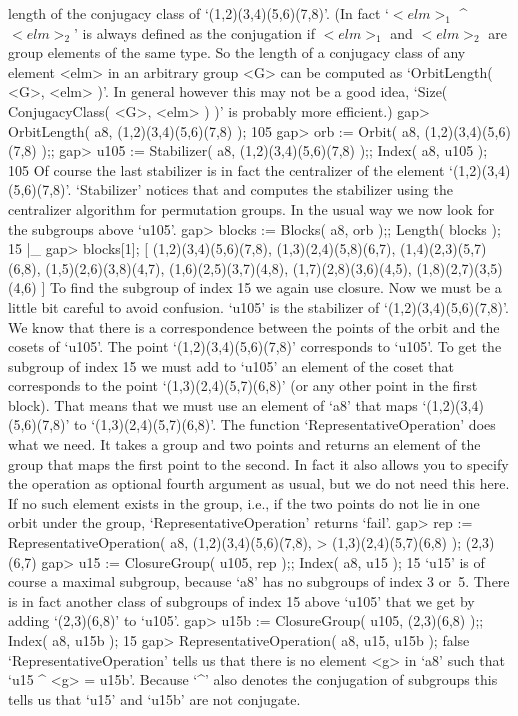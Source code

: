 length of  the  conjugacy   class of  `(1,2)(3,4)(5,6)(7,8)'.   (In  fact
`$<elm>_1$ ^ $<elm>_2$' is always defined as the conjugation if $<elm>_1$
and $<elm>_2$ are group elements  of the same  type. So  the length of  a
conjugacy  class of any  element <elm> in an   arbitrary group <G> can be
computed as `OrbitLength( <G>, <elm> )'.  In general however this may not
be a good  idea, `Size( ConjugacyClass( <G>,  <elm> ) )' is probably more
efficient.)
\beginexample
    gap> OrbitLength( a8, (1,2)(3,4)(5,6)(7,8) );
    105
    gap> orb := Orbit( a8, (1,2)(3,4)(5,6)(7,8) );;
    gap> u105 := Stabilizer( a8, (1,2)(3,4)(5,6)(7,8) );; Index( a8, u105 );
    105 
\endexample
Of course the  last stabilizer is in  fact the centralizer of the element
`(1,2)(3,4)(5,6)(7,8)'.  `Stabilizer' notices    that and computes    the
stabilizer using the centralizer algorithm for permutation groups. In the
usual way we now look for the subgroups above `u105'.
\beginexample
    gap> blocks := Blocks( a8, orb );; Length( blocks );
    15
|_
    gap> blocks[1];
    [ (1,2)(3,4)(5,6)(7,8), (1,3)(2,4)(5,8)(6,7), (1,4)(2,3)(5,7)(6,8),
      (1,5)(2,6)(3,8)(4,7), (1,6)(2,5)(3,7)(4,8), (1,7)(2,8)(3,6)(4,5),
      (1,8)(2,7)(3,5)(4,6) ]
\endexample
To find the subgroup of index 15 we  again use closure. Now  we must be a
little bit  careful to avoid    confusion. `u105' is the  stabilizer   of
`(1,2)(3,4)(5,6)(7,8)'. We  know  that there is  a correspondence between
the  points  of  the   orbit and  the   cosets  of  `u105'.   The   point
`(1,2)(3,4)(5,6)(7,8)' corresponds   to `u105'.  To get  the  subgroup of
index 15 we  must add to `u105' an  element of the coset that corresponds
to the   point `(1,3)(2,4)(5,7)(6,8)' (or any other   point  in the first
block).  That means   that  we must  use  an  element of `a8'  that  maps
`(1,2)(3,4)(5,6)(7,8)' to  `(1,3)(2,4)(5,7)(6,8)'.        The    function
`RepresentativeOperation'   does what we need. It   takes a group and two
points and returns an  element of the group that  maps the first point to
the   second. In fact it   also allows you  to   specify the operation as
optional fourth argument as usual,  but we do  not need this here. If  no
such element exists in the  group, i.e., if the  two points do not lie in
one orbit under the group, `RepresentativeOperation' returns `fail'.
\beginexample
    gap> rep := RepresentativeOperation( a8, (1,2)(3,4)(5,6)(7,8),
    >                                        (1,3)(2,4)(5,7)(6,8) );
    (2,3)(6,7)
    gap> u15 := ClosureGroup( u105, rep );; Index( a8, u15 );
    15 
\endexample
`u15' is of course a maximal  subgroup, because `a8'  has no subgroups of
index 3 or~5.  There is in fact  another  class of subgroups  of index 15
above `u105' that we get by adding `(2,3)(6,8)' to `u105'.
\beginexample
    gap> u15b := ClosureGroup( u105, (2,3)(6,8) );; Index( a8, u15b );
    15 
    gap> RepresentativeOperation( a8, u15, u15b );
    false 
\endexample
`RepresentativeOperation' tells us that  there is no  element <g> in `a8'
such that `u15 ^ <g> = u15b'. Because `^' also denotes the conjugation of
subgroups this tells us  that  `u15' and  `u15b' are not  conjugate.

